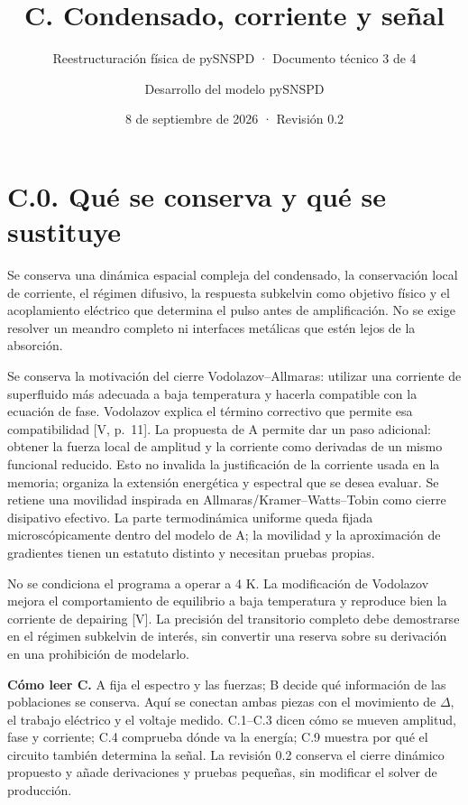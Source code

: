 \documentclass[
  spanish,
  10pt,
  a4paper,
]{article}
\title{C. Condensado, corriente y señal}
\subtitle{Reestructuración física de pySNSPD · Documento técnico 3 de 4}
\author{Desarrollo del modelo pySNSPD}
\date{8 de septiembre de 2026 · Revisión 0.2}
\begin{document}
\maketitle

{
\setcounter{tocdepth}{2}
\tableofcontents
}
\newpage

\section{C.0. Qué se conserva y qué se
sustituye}\label{c.0.-quuxe9-se-conserva-y-quuxe9-se-sustituye}

Se conserva una dinámica espacial compleja del condensado, la
conservación local de corriente, el régimen difusivo, la respuesta
subkelvin como objetivo físico y el acoplamiento eléctrico que determina
el pulso antes de amplificación. No se exige resolver un meandro
completo ni interfaces metálicas que estén lejos de la absorción.

Se conserva la motivación del cierre Vodolazov--Allmaras: utilizar una
corriente de superfluido más adecuada a baja temperatura y hacerla
compatible con la ecuación de fase. Vodolazov explica el término
correctivo que permite esa compatibilidad {[}V, p.~11{]}. La propuesta
de A permite dar un paso adicional: obtener la fuerza local de amplitud
y la corriente como derivadas de un mismo funcional reducido. Esto no
invalida la justificación de la corriente usada en la memoria; organiza
la extensión energética y espectral que se desea evaluar. Se retiene una
movilidad inspirada en Allmaras/Kramer--Watts--Tobin como cierre
disipativo efectivo. La parte termodinámica uniforme queda fijada
microscópicamente dentro del modelo de A; la movilidad y la aproximación
de gradientes tienen un estatuto distinto y necesitan pruebas propias.

No se condiciona el programa a operar a 4 K. La modificación de
Vodolazov mejora el comportamiento de equilibrio a baja temperatura y
reproduce bien la corriente de depairing {[}V{]}. La precisión del
transitorio completo debe demostrarse en el régimen subkelvin de
interés, sin convertir una reserva sobre su derivación en una
prohibición de modelarlo.

\textbf{Cómo leer C.} A fija el espectro y las fuerzas; B decide qué
información de las poblaciones se conserva. Aquí se conectan ambas
piezas con el movimiento de \(\Delta\), el trabajo eléctrico y el
voltaje medido. C.1--C.3 dicen cómo se mueven amplitud, fase y
corriente; C.4 comprueba dónde va la energía; C.9 muestra por qué el
circuito también determina la señal. La revisión 0.2 conserva el cierre
dinámico propuesto y añade derivaciones y pruebas pequeñas, sin
modificar el solver de producción.
\end{document}
